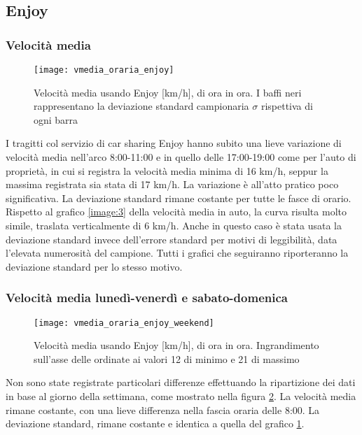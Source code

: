 \subsection{Enjoy}

\subsubsection{Velocità media}

\begin{figure}[H]
\texttt{[image: vmedia\_oraria\_enjoy]}
\caption{Velocità media usando Enjoy [km/h], di ora in ora.  I baffi neri rappresentano la deviazione standard campionaria $\sigma$ rispettiva di ogni barra}
\label{image:7}
\end{figure}

I tragitti col servizio di car sharing Enjoy hanno subito una lieve variazione di velocità media nell'arco 8:00-11:00 e in quello delle 17:00-19:00 come per l'auto di proprietà, in cui si registra la velocità media minima di 16 km/h, seppur la massima registrata sia stata di 17 km/h. La variazione è all'atto pratico poco significativa. La deviazione standard rimane costante per tutte le fasce di orario. Rispetto al grafico \ref{image:3} della velocità media in auto, la curva risulta molto simile, traslata verticalmente di 6 km/h. Anche in questo caso è stata usata la deviazione standard invece dell'errore standard per motivi di leggibilità, data l'elevata numerosità del campione. Tutti i grafici che seguiranno riporteranno la deviazione standard per lo stesso motivo.

\subsubsection{Velocità media lunedì-venerdì e sabato-domenica}

\begin{figure}[H]
	\texttt{[image: vmedia\_oraria\_enjoy\_weekend]}
	\caption{Velocità media usando Enjoy [km/h], di ora in ora. Ingrandimento sull'asse delle ordinate ai valori 12 di minimo e 21 di massimo}
	\label{image:20}
\end{figure}

Non sono state registrate particolari differenze effettuando la ripartizione dei dati in base al giorno della settimana, come mostrato nella figura \ref{image:20}. La velocità media rimane costante, con una lieve differenza nella fascia oraria delle 8:00. La deviazione standard, rimane costante e identica a quella del grafico \ref{image:7}.

